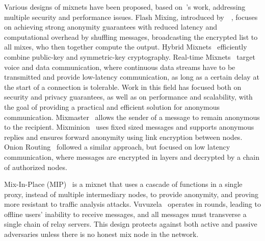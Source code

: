 Various designs of mixnets have been proposed, based on~\citeauthor{Chaum2003}'s work, addressing multiple security and performance issues. Flash Mixing, introduced by~\citeauthor{FlashMixing}~\cite{FlashMixing}, focuses on achieving strong anonymity guarantees with reduced latency and computational overhead by shuffling messages, broadcasting the encrypted list to all mixes, who then together compute the output. Hybrid Mixnets~\cite*{HybridMixJakobsson, HybridMixMiyako} efficiently combine public-key and symmetric-key cryptography. Real-time Mixnets~\cite{RealTimeMix} target voice and data communication, where continuous data streams have to be transmitted and provide low-latency communication, as long as a certain delay at the start of a connection is tolerable.
Work in this field has focused both on security and privacy guarantees, as well as on performance and scalability, with the goal of providing a practical and efficient solution for anonymous communication. Mixmaster~\cite{Mixmaster} allows the sender of a message to remain anonymous to the recipient. Mixminion~\cite{Mixminion} uses fixed sized messages and supports anonymous replies and ensures forward anonymity using link encryption between nodes.
Onion Routing~\cite{OnionRouting} followed a similar approach, but focused on low latency communication, where messages are encrypted in layers and decrypted by a chain of authorized nodes. 

Mix-In-Place (MIP)~\cite{MixInPlace} is a mixnet that uses a cascade of functions in a single proxy, instead of multiple intermediary nodes, to provide anonymity, and proving more resistant to traffic analysis attacks. 
Vuvuzela~\cite{Vuvuzela} operates in rounds, leading to offline users' inability to receive messages, and all messages must transverse a single chain of relay servers. This design protects against both active and passive adversaries unless there is no honest mix node in the network.

